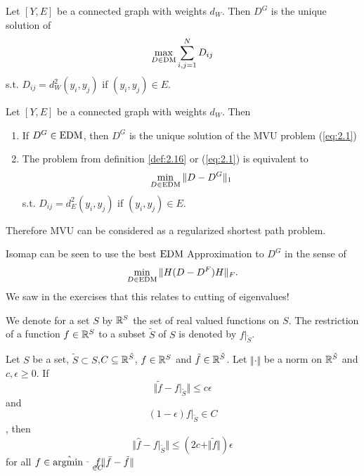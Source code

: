 \begin{corollary}\label{cor:2.18}
    Let $[Y,E]$ be a connected graph with weights $d_W$. Then $D^G$ is the unique solution of 
    \[\max_{D\in \text{DM}}\sum_{i,j=1}^N D_{ij}\]
    s.t. $D_{ij}=d_W^2(y_i,y_j)$ if $(y_i,y_j)\in E$.
\end{corollary}


\begin{corollary}
    Let $[Y,E]$ be a connected graph with weights $d_W$. Then
    \begin{enumerate}
        \item If $D^G\in\text{EDM}$, then $D^G$ is the unique solution of the MVU problem (\ref{eq:2.1})
        \item The problem from definition \ref{def:2.16} or (\ref{eq:2.1}) is equivalent to 
            \[\min_{D\in \text{EDM}}\Vert D-D^G\Vert_1\] s.t. $D_{ij}=d_E^2(y_i,y_j)$ if $(y_i,y_j)\in E$. 
    \end{enumerate}
\end{corollary}

Therefore MVU can be considered as a regularized shortest path problem.

\begin{remark}
    Isomap can be seen to use the best $\text{EDM}$ Approximation to $D^G$ in the sense of 
    \[\min_{D\in \text{EDM}}\Vert H(D-D^F)H\Vert_F.\] We saw in the exercises that this relates to cutting of eigenvalues!    
\end{remark}

We denote for a set $S$ by $\mathbb{R}^S$ the set of real valued functions on $S$. The restriction of a function 
$f\in \mathbb{R}^S$ to a subset $\tilde{S}$ of $S$ is denoted by $f\vert_{\tilde{S}}$.

\begin{lemma}\label{lem:2.20}
    Let $S$ be a set, $\tilde{S}\subset S$,$C\subseteq\mathbb{R}^{\tilde{S}}$, $f\in\mathbb{R}^S$ and $\tilde{f}\in\mathbb{R}^{\tilde{S}}$. Let $\Vert \cdot\Vert$ be a 
    norm on $\mathbb{R}^{\tilde{S}}$ and $c,\epsilon\geq 0$. If \begin{equation}
        \Vert \tilde{f}-f\vert_{\tilde{S}}\Vert \leq c\epsilon
    \label{eq:2.4}\end{equation} and  \begin{equation}
        (1-\epsilon)f\vert_{\tilde{S}}\in C\label{eq:2.5}
    \end{equation},
    then 
    \[\Vert \hat{f}-f\vert_{\tilde{S}}\Vert \leq (2c+\Vert \tilde{f}\Vert)\epsilon\]
    for all $\hat{f\in\operatorname*{\text{argmin}}_{\bar{f}\in C}}\Vert\bar{f}-\tilde{f}\Vert $
\end{lemma}


